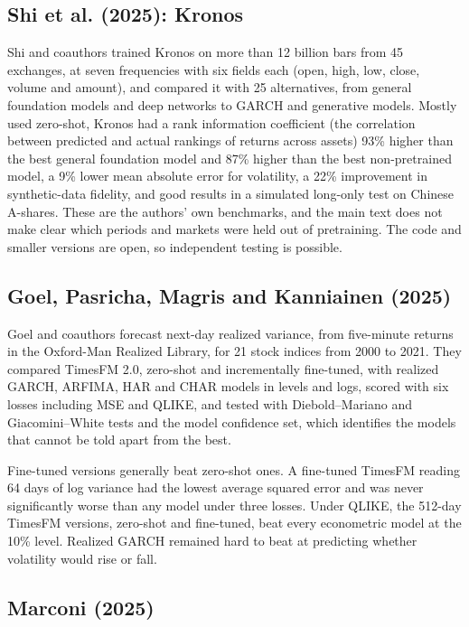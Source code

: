 \subsection{Shi et al. (2025): Kronos}

Shi and coauthors trained Kronos on more than 12 billion bars from 45 exchanges, at seven frequencies with six fields each (open, high, low, close, volume and amount), and compared it with 25 alternatives, from general foundation models and deep networks to GARCH and generative models. Mostly used zero-shot, Kronos had a rank information coefficient (the correlation between predicted and actual rankings of returns across assets) 93\% higher than the best general foundation model and 87\% higher than the best non-pretrained model, a 9\% lower mean absolute error for volatility, a 22\% improvement in synthetic-data fidelity, and good results in a simulated long-only test on Chinese A-shares. These are the authors' own benchmarks, and the main text does not make clear which periods and markets were held out of pretraining. The code and smaller versions are open, so independent testing is possible.

\subsection{Goel, Pasricha, Magris and Kanniainen (2025)}

Goel and coauthors forecast next-day realized variance, from five-minute returns in the Oxford-Man Realized Library, for 21 stock indices from 2000 to 2021. They compared TimesFM 2.0, zero-shot and incrementally fine-tuned, with realized GARCH, ARFIMA, HAR and CHAR models in levels and logs, scored with six losses including MSE and QLIKE, and tested with Diebold--Mariano and Giacomini--White tests and the model confidence set, which identifies the models that cannot be told apart from the best.

Fine-tuned versions generally beat zero-shot ones. A fine-tuned TimesFM reading 64 days of log variance had the lowest average squared error and was never significantly worse than any model under three losses. Under QLIKE, the 512-day TimesFM versions, zero-shot and fine-tuned, beat every econometric model at the 10\% level. Realized GARCH remained hard to beat at predicting whether volatility would rise or fall.

\subsection{Marconi (2025)}

